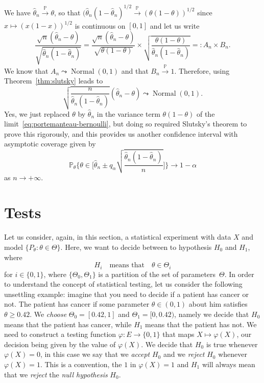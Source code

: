 \documentclass[
	fontsize=11pt, %
	twoside=false, %
	numbers=noenddot, %
]{kaobook}
\DeclareMathOperator{\nor}{Normal}
\renewcommand{\P}{\mathbb P}
\newcommand{\wh}{\widehat}
\newcommand{\goes}{\rightarrow}
\newcommand{\gopro}{\overset{\P}{\rightarrow}}
\newcommand{\gosto}{\leadsto}
\begin{document}
We have $\wh \theta_n \gopro \theta$, so that $(\wh \theta_n (1 - \wh \theta_n)^{1/2} \gopro (\theta (1 -  \theta))^{1/2}$ since $x \mapsto (x(1-x))^{1/2}$ is continuous on $[0, 1]$ and let us write
\begin{equation*}
	\frac{\sqrt n (\wh \theta_n - \theta)}{\sqrt{\wh \theta_n (1 - \wh \theta_n)}} 
	= \frac{\sqrt n (\wh \theta_n - \theta)}{\sqrt{ \theta (1 -  \theta)}} \times 
	\sqrt{\frac{ \theta (1 -  \theta)}{\wh \theta_n (1 - \wh \theta_n)}} =: A_n \times B_n.
\end{equation*}
We know that $A_n \gosto \nor(0, 1)$ and that $B_n \gopro 1$.
Therefore, using Theorem~\ref{thm:slutsky} leads%
%
to
\begin{equation*}
	\sqrt{\frac{n}{\wh \theta_n (1 - \wh \theta_n)}} (\wh \theta_n - \theta) \gosto \nor(0, 1).
\end{equation*}
Yes, we just replaced $\theta$ by $\wh \theta_n$ in the variance term $\theta(1 - \theta)$ of the limit~\eqref{eq:portemanteau-bernoulli}, but doing so required Slutsky's theorem to prove this rigorously, and this provides us another confidence interval with asymptotic coverage given by
\begin{equation*}
	\P_\theta \bigg\{ \theta \in \Big[ \wh \theta_n \pm q_\alpha \sqrt{\frac{\wh \theta_n (1 - \wh \theta_n)}{n}} \Big] \bigg\} \goes 1 - \alpha
\end{equation*}
as $n \goes +\infty$.%
%


\section{Tests} %
\label{sec:tests}

Let us consider, again, in this section, a statistical experiment with data $X$ and model $\{ P_\theta : \theta \in \Theta \}$.
Here, we want to decide between to hypothesis $H_0$ and $H_1$, where
\begin{equation*}
	H_i \quad \text{means that} \quad \theta \in \Theta_i
\end{equation*}
for $i \in \{ 0, 1 \}$, where $\{ \Theta_0, \Theta_1 \}$ is a partition of the set of parameters~$\Theta$.
In order to understand the concept of statistical testing, let us consider the following unsettling example: imagine that you need to decide if a patient has cancer or not.
The patient has cancer if some parameter $\theta \in (0, 1)$ about him satisfies
$\theta \geq 0.42$.
We \emph{choose} $\Theta_0 = [0.42, 1]$ and $\Theta_1 = [0, 0.42)$, namely we decide that $H_0$ means that the patient has cancer, while $H_1$ means that the patient has not.
We need to construct a testing function $\varphi : E \goes \{ 0, 1 \}$ that maps $X \mapsto \varphi(X)$, our decision being given by the value of $\varphi(X)$. 
We decide that $H_0$ is true whenever $\varphi(X) = 0$, in this case we say that we \emph{accept} $H_0$ and we \emph{reject} $H_0$ whenever $\varphi(X) = 1$.
This is a convention, the $1$ in $\varphi(X) = 1$ and $H_1$ will always mean that we \emph{reject} the \emph{null hypothesis} $H_0$.
\end{document}
